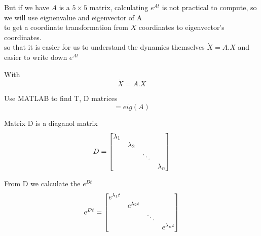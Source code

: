 But if we have $ A $ is a $5 \times 5$ matrix, calculating $ e^{At} $ is not practical to compute, so we will use eignenvalue and eigenvector of A
\\to get a coordinate transformation from $ X $ coordinates to eigenvector's coordinates.
\\so that it is easier for us to understand the dynamics themselves $ \dot{X} = A.X $ and easier to write down $ e^{At} $

With 
\begin{equation} 
  \dot{X} = A.X
\end{equation}

Use MATLAB to find T, D matrices
\begin{equation}
  [T, D] = eig(A)
\end{equation}

Matrix D is a diaganol matrix
\begin{equation} 
D = \begin{bmatrix}
      $$\lambda_{1}$$ &  &  &\\ 
      & $$\lambda_{2}$$   &  &\\ 
      & & \ddots & \\ 
      & & & $$\lambda_{n}$$
    \end{bmatrix}
  \end{equation}

From D we calculate the $e^{Dt}$  
  \\\begin{equation} 
    e^{Dt} = 
      \begin{bmatrix} 
        $$e^{\lambda_{1}t}$$  &  &  & \\ 
        & $$e^{\lambda_{2}t}$$   &  & \\ 
        & & \ddots & \\ 
        & & & $$e^{\lambda_{n}t}$$
      \end{bmatrix} 
    \end{equation}
